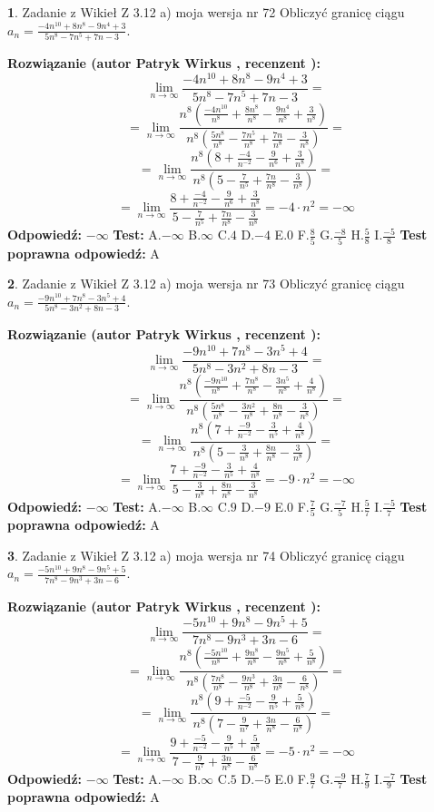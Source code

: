 \documentclass[12pt, a4paper]{article}
\theoremstyle{definition} %
\newtheorem{zad}{}
\newcommand{\zadStart}[1]{\begin{zad}#1\newline}
\newcommand{\zadStop}{\end{zad}}
\newcommand{\rozwStart}[2]{\noindent \textbf{Rozwiązanie (autor #1 , recenzent #2): }\newline}
\newcommand{\rozwStop}{\newline}
\newcommand{\odpStart}{\noindent \textbf{Odpowiedź:}\newline}
\newcommand{\odpStop}{\newline}
\newcommand{\testStart}{\noindent \textbf{Test:}\newline}
\newcommand{\testStop}{\newline}
\newcommand{\kluczStart}{\noindent \textbf{Test poprawna odpowiedź:}\newline}
\newcommand{\kluczStop}{\newline}
\begin{document}
\zadStart{Zadanie z Wikieł Z 3.12 a) moja wersja nr 72}
Obliczyć granicę ciągu $a_{n}=\frac{-4n^{10}+8n^{8}-9n^{4}+3}{5n^{8}-7n^{5}+7n-3}$.
\zadStop
\rozwStart{Patryk Wirkus}{}
$$\lim\limits_{n\to\infty}\frac{-4n^{10}+8n^{8}-9n^{4}+3}{5n^{8}-7n^{5}+7n-3}=$$
$$=\lim\limits_{n\to\infty}\frac{n^{8}\left(\frac{-4n^{10}}{n^{8}}+\frac{8n^{8}}{n^{8}}-\frac{9n^{4}}{n^{8}}+\frac{3}{n^{8}}\right)}{n^{8}\left(\frac{5n^{8}}{n^{8}}-\frac{7n^{5}}{n^{8}}+\frac{7n}{n^{8}}-\frac{3}{n^{8}}\right)}=$$
$$=\lim\limits_{n\to\infty}\frac{n^{8}\left(8+\frac{-4}{n^{-2}}-\frac{9}{n^{6}}+\frac{3}{n^{8}}\right)}
{n^{8}\left(5-\frac{7}{n^{5}}+\frac{7n}{n^{8}}-\frac{3}{n^{8}}\right)}=$$
$$=\lim\limits_{n\to\infty}\frac{8+\frac{-4}{n^{-2}}-\frac{9}{n^{6}}+\frac{3}{n^{8}}}{5-\frac{7}{n^{5}}+\frac{7n}{n^{8}}-\frac{3}{n^{8}}}=-4\cdot n^{2} = -\infty$$
\rozwStop
\odpStart
$-\infty$
\odpStop
\testStart
A.$-\infty$
B.$\infty$
C.$4$
D.$-4$
E.$0$
F.$\frac{8}{5}$
G.$\frac{-8}{5}$
H.$\frac{5}{8}$
I.$\frac{-5}{8}$
\testStop
\kluczStart
A
\kluczStop



\zadStart{Zadanie z Wikieł Z 3.12 a) moja wersja nr 73}
Obliczyć granicę ciągu $a_{n}=\frac{-9n^{10}+7n^{8}-3n^{5}+4}{5n^{8}-3n^{2}+8n-3}$.
\zadStop
\rozwStart{Patryk Wirkus}{}
$$\lim\limits_{n\to\infty}\frac{-9n^{10}+7n^{8}-3n^{5}+4}{5n^{8}-3n^{2}+8n-3}=$$
$$=\lim\limits_{n\to\infty}\frac{n^{8}\left(\frac{-9n^{10}}{n^{8}}+\frac{7n^{8}}{n^{8}}-\frac{3n^{5}}{n^{8}}+\frac{4}{n^{8}}\right)}{n^{8}\left(\frac{5n^{8}}{n^{8}}-\frac{3n^{2}}{n^{8}}+\frac{8n}{n^{8}}-\frac{3}{n^{8}}\right)}=$$
$$=\lim\limits_{n\to\infty}\frac{n^{8}\left(7+\frac{-9}{n^{-2}}-\frac{3}{n^{5}}+\frac{4}{n^{8}}\right)}
{n^{8}\left(5-\frac{3}{n^{8}}+\frac{8n}{n^{8}}-\frac{3}{n^{8}}\right)}=$$
$$=\lim\limits_{n\to\infty}\frac{7+\frac{-9}{n^{-2}}-\frac{3}{n^{5}}+\frac{4}{n^{8}}}{5-\frac{3}{n^{8}}+\frac{8n}{n^{8}}-\frac{3}{n^{8}}}=-9\cdot n^{2} = -\infty$$
\rozwStop
\odpStart
$-\infty$
\odpStop
\testStart
A.$-\infty$
B.$\infty$
C.$9$
D.$-9$
E.$0$
F.$\frac{7}{5}$
G.$\frac{-7}{5}$
H.$\frac{5}{7}$
I.$\frac{-5}{7}$
\testStop
\kluczStart
A
\kluczStop



\zadStart{Zadanie z Wikieł Z 3.12 a) moja wersja nr 74}
Obliczyć granicę ciągu $a_{n}=\frac{-5n^{10}+9n^{8}-9n^{5}+5}{7n^{8}-9n^{3}+3n-6}$.
\zadStop
\rozwStart{Patryk Wirkus}{}
$$\lim\limits_{n\to\infty}\frac{-5n^{10}+9n^{8}-9n^{5}+5}{7n^{8}-9n^{3}+3n-6}=$$
$$=\lim\limits_{n\to\infty}\frac{n^{8}\left(\frac{-5n^{10}}{n^{8}}+\frac{9n^{8}}{n^{8}}-\frac{9n^{5}}{n^{8}}+\frac{5}{n^{8}}\right)}{n^{8}\left(\frac{7n^{8}}{n^{8}}-\frac{9n^{3}}{n^{8}}+\frac{3n}{n^{8}}-\frac{6}{n^{8}}\right)}=$$
$$=\lim\limits_{n\to\infty}\frac{n^{8}\left(9+\frac{-5}{n^{-2}}-\frac{9}{n^{5}}+\frac{5}{n^{8}}\right)}
{n^{8}\left(7-\frac{9}{n^{7}}+\frac{3n}{n^{8}}-\frac{6}{n^{8}}\right)}=$$
$$=\lim\limits_{n\to\infty}\frac{9+\frac{-5}{n^{-2}}-\frac{9}{n^{5}}+\frac{5}{n^{8}}}{7-\frac{9}{n^{7}}+\frac{3n}{n^{8}}-\frac{6}{n^{8}}}=-5\cdot n^{2} = -\infty$$
\rozwStop
\odpStart
$-\infty$
\odpStop
\testStart
A.$-\infty$
B.$\infty$
C.$5$
D.$-5$
E.$0$
F.$\frac{9}{7}$
G.$\frac{-9}{7}$
H.$\frac{7}{9}$
I.$\frac{-7}{9}$
\testStop
\kluczStart
A
\kluczStop
\end{document}
